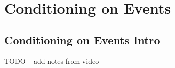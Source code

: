 \documentclass[6008notes.tex]{subfiles}
\begin{document}
\graphicspath{ {images/conditioning/} }

\section{Conditioning on Events}

\subsection{Conditioning on Events Intro}

TODO -- add notes from video

\end{document}
